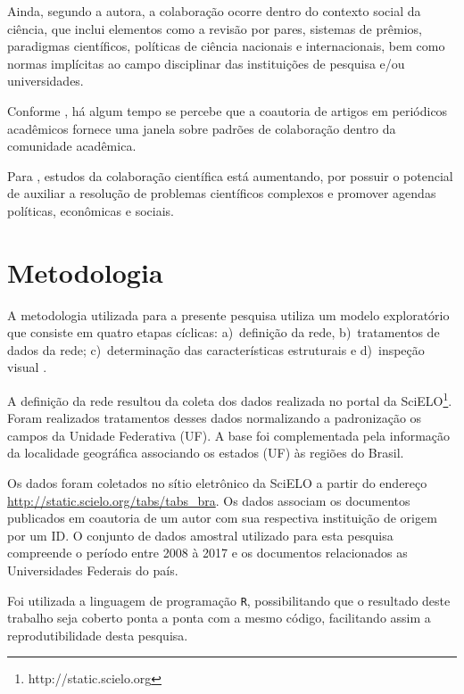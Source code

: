 \documentclass[12pt]{article}
\begin{document}
Ainda, segundo a autora, a colaboração ocorre dentro do contexto social da ciência, que inclui elementos como a revisão por pares, sistemas de prêmios, paradigmas científicos, políticas de ciência nacionais e internacionais, bem como normas implícitas ao campo disciplinar das instituições de pesquisa e/ou universidades. 

Conforme \cite{Newman2004}, há algum tempo se percebe que a coautoria de artigos em periódicos acadêmicos fornece uma janela sobre padrões de colaboração dentro da comunidade acadêmica. 

Para \cite{Sonnenwald}, estudos da colaboração científica está aumentando, por possuir o potencial de auxiliar a resolução de problemas científicos complexos e promover agendas políticas, econômicas e sociais. 

\section{Metodologia} 

A metodologia utilizada para a presente pesquisa utiliza um modelo exploratório que consiste em quatro etapas cíclicas: 
a)~definição da rede, 
b)~tratamentos de dados da rede; 
c)~determinação das características estruturais e 
d)~inspeção visual \cite{de2018exploratory}.

A definição da rede resultou da coleta dos dados realizada no portal da SciELO\footnote{http://static.scielo.org}. 
Foram  realizados tratamentos desses dados normalizando a padronização os campos da Unidade Federativa (UF). 
A base foi complementada pela informação da localidade geográfica associando os estados (UF) às regiões do Brasil. 

Os dados foram coletados no sítio eletrônico da SciELO a partir do endereço \url{http://static.scielo.org/tabs/tabs_bra}. Os dados associam os documentos publicados em coautoria de um autor com sua respectiva instituição de origem por um ID. O conjunto de dados amostral utilizado para esta pesquisa compreende o período entre 2008 à 2017 e os documentos relacionados as Universidades Federais do país.  

Foi utilizada a linguagem de programação \texttt R, possibilitando que o resultado deste trabalho seja coberto ponta a ponta com a mesmo código, facilitando assim a reprodutibilidade desta pesquisa.
\end{document}
